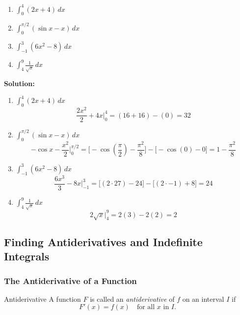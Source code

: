 \documentclass[12pt]{article}
\theoremstyle{beautifulthm}
\begin{document}
\newpage
\begin{tcolorbox}[colback=examplebg, colframe=red!75!black, title=\textbf{EXAMPLE 2: Find the Integral of the Function}, fonttitle=\bfseries, sharp corners]
\begin{enumerate}
    \item $\int_0^4 (2x + 4) \, dx$
    \item $\int_0^{\pi/2} (\sin x - x) \, dx$
    \item $\int_{-1}^3 (6x^2 - 8) \, dx$
    \item $\int_4^9 \frac{1}{\sqrt{x}} \, dx$
\end{enumerate}



\tcblower
\textbf{Solution:} 
\begin{enumerate}
    \item $\int_0^4 (2x + 4) \, dx$
    \[
    \frac{2x^2}{2} + 4x \Big|_0^4 = (16 + 16) - (0) = 32
    \]

    \item $\int_0^{\pi/2} (\sin x - x) \, dx$
    \[
    -\cos x - \frac{x^2}{2} \Big|_0^{\pi/2} = \Big[-\cos\left(\frac{\pi}{2}\right) - \frac{\pi^2}{8}\Big] - \Big[ - \cos(0) - 0\Big] = 1 - \frac{\pi^2}{8}
    \]

    \item $\int_{-1}^3 (6x^2 - 8) \, dx$
    \[
    \frac{6x^3}{3} - 8x \Big|_{-1}^3 = \Big[(2 \cdot 27) - 24\Big] - \Big[ (2 \cdot -1) + 8\Big] = 24
    \]

    \item $\int_4^9 \frac{1}{\sqrt{x}} \, dx$
    \[
    2\sqrt{x} \Big|_4^9 = 2(3) - 2(2) = 2
    \]

\end{enumerate}
\end{tcolorbox}

\newpage
\subsection{Finding Antiderivatives and Indefinite Integrals}

\subsubsection{The Antiderivative of a Function}
\begin{Definition}{Antiderivative }{}
    A function $F$ is called an \textit{antiderivative} of $f$ on an interval $I$ if 
\[
F'(x) = f(x) \quad \text{for all } x \text{ in } I.
\]
\end{Definition}
\end{document}
